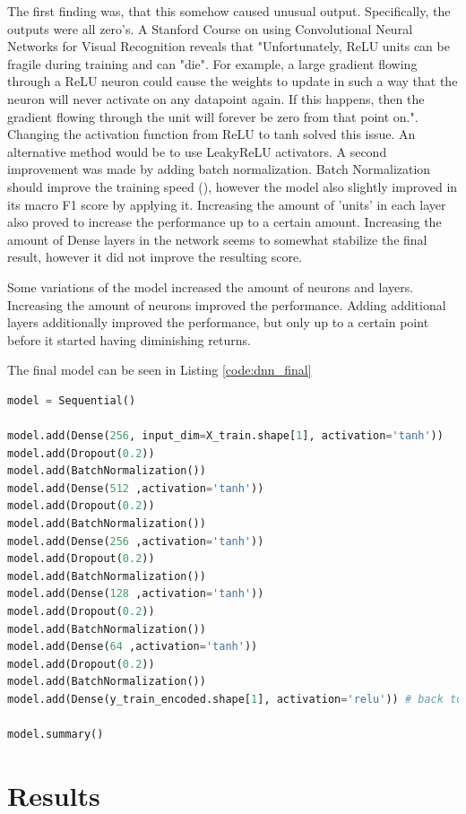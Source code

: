 \documentclass[preprint,12pt]{elsarticle}
\begin{document}
The first finding was, that this somehow caused unusual output. Specifically, the outputs were all zero's. A Stanford Course on using Convolutional Neural Networks for Visual Recognition reveals that "Unfortunately, ReLU units can be fragile during training and can "die". For example, a large gradient flowing through a ReLU neuron could cause the weights to update in such a way that the neuron will never activate on any datapoint again. If this happens, then the gradient flowing through the unit will forever be zero from that point on."\cite{CSN:ReLU}. Changing the activation function from ReLU to tanh solved this issue. An alternative method would be to use LeakyReLU activators.
A second improvement was made by adding batch normalization. Batch Normalization should improve the training speed (\citet{Ioffe:2015}), however the model also slightly improved in its macro F1 score by applying it. Increasing the amount of 'units' in each layer also proved to increase the performance up to a certain amount. Increasing the amount of Dense layers in the network seems to somewhat stabilize the final result, however it did not improve the resulting score.

Some variations of the model increased the amount of neurons and layers. Increasing the amount of neurons improved the performance. Adding additional layers additionally improved the performance, but only up to a certain point before it started having diminishing returns.

The final model can be seen in Listing \ref{code:dnn_final}

\begin{lstlisting}[language=Python, label={code:dnn_final},caption={Final Deep Neural Network}]
model = Sequential()

model.add(Dense(256, input_dim=X_train.shape[1], activation='tanh'))
model.add(Dropout(0.2))
model.add(BatchNormalization())
model.add(Dense(512 ,activation='tanh'))
model.add(Dropout(0.2))
model.add(BatchNormalization())
model.add(Dense(256 ,activation='tanh'))
model.add(Dropout(0.2))
model.add(BatchNormalization())
model.add(Dense(128 ,activation='tanh'))
model.add(Dropout(0.2))
model.add(BatchNormalization())
model.add(Dense(64 ,activation='tanh'))
model.add(Dropout(0.2))
model.add(BatchNormalization())
model.add(Dense(y_train_encoded.shape[1], activation='relu')) # back to one-hot-encoded result

model.summary()
\end{lstlisting}

\section{Results}
\label{S:4}
\end{document}
